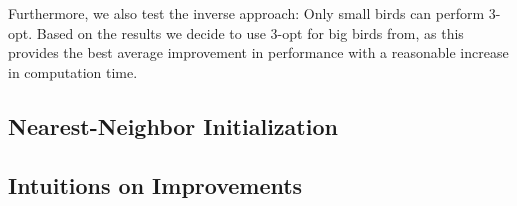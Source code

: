 Furthermore, we also test the inverse approach: Only small birds can perform 3-opt.
Based on the results we decide to use 3-opt for big birds from, as this provides the best average improvement in performance with a reasonable increase in computation time.

\subsection{Nearest-Neighbor Initialization}

\subsection{Intuitions on Improvements}